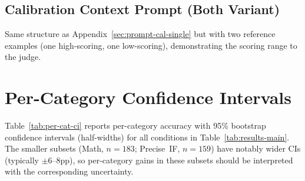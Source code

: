 \documentclass{article}
\begin{document}
\subsection{Calibration Context Prompt (Both Variant)}
\label{sec:prompt-cal-both}

Same structure as Appendix~\ref{sec:prompt-cal-single} but with two reference examples (one high-scoring, one low-scoring), demonstrating the scoring range to the judge.

\section{Per-Category Confidence Intervals}
\label{sec:per-cat-ci}

Table~\ref{tab:per-cat-ci} reports per-category accuracy with 95\% bootstrap confidence intervals (half-widths) for all conditions in Table~\ref{tab:results-main}. The smaller subsets (Math, $n{=}183$; Precise~IF, $n{=}159$) have notably wider CIs (typically $\pm$6--8pp), so per-category gains in these subsets should be interpreted with the corresponding uncertainty.
\end{document}
